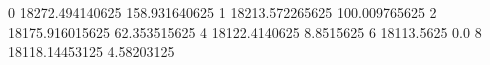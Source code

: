 0 18272.494140625 158.931640625
1 18213.572265625 100.009765625
2 18175.916015625 62.353515625
4 18122.4140625 8.8515625
6 18113.5625 0.0
8 18118.14453125 4.58203125
